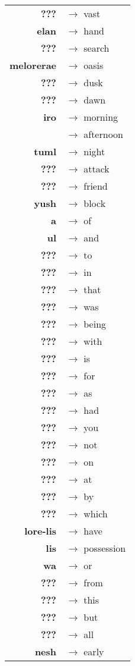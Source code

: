 \begin{tabular}{rl}
\textbf{???} & $\rightarrow$ vast \\
\textbf{elan} & $\rightarrow$ hand \\
\textbf{???} & $\rightarrow$ search \\
\textbf{melorerae} & $\rightarrow$ oasis \\
\textbf{???} & $\rightarrow$ dusk \\
\textbf{???} & $\rightarrow$ dawn \\
\textbf{iro} & $\rightarrow$ morning \\
\textbf{} & $\rightarrow$ afternoon \\
\textbf{tuml} & $\rightarrow$ night \\
\textbf{???} & $\rightarrow$ attack \\
\textbf{???} & $\rightarrow$ friend \\
\textbf{yush} & $\rightarrow$ block \\
\textbf{a} & $\rightarrow$ of \\
\textbf{ul} & $\rightarrow$ and \\
\textbf{???} & $\rightarrow$ to \\
\textbf{???} & $\rightarrow$ in \\
\textbf{???} & $\rightarrow$ that \\
\textbf{???} & $\rightarrow$ was \\
\textbf{???} & $\rightarrow$ being \\
\textbf{???} & $\rightarrow$ with \\
\textbf{???} & $\rightarrow$ is \\
\textbf{???} & $\rightarrow$ for \\
\textbf{???} & $\rightarrow$ as \\
\textbf{???} & $\rightarrow$ had \\
\textbf{???} & $\rightarrow$ you \\
\textbf{???} & $\rightarrow$ not \\
\textbf{???} & $\rightarrow$ on \\
\textbf{???} & $\rightarrow$ at \\
\textbf{???} & $\rightarrow$ by \\
\textbf{???} & $\rightarrow$ which \\
\textbf{lore-lis} & $\rightarrow$ have \\
\textbf{lis} & $\rightarrow$ possession\\
\textbf{wa} & $\rightarrow$ or \\
\textbf{???} & $\rightarrow$ from \\
\textbf{???} & $\rightarrow$ this \\
\textbf{???} & $\rightarrow$ but \\
\textbf{???} & $\rightarrow$ all \\
\textbf{nesh} & $\rightarrow$ early \\
\end{tabular}


